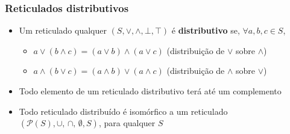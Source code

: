 \documentclass[12pt]{beamer}
\begin{document}
\begin{frame}
  \frametitle{Reticulados distributivos}
  \begin{itemize}
    \item<1-> Um reticulado qualquer $(S, \vee, \wedge, \bot, \top)$ é
        \textbf{distributivo} se, $\forall a, b, c \in S$,
    \begin{itemize}[itemsep=0pt]
      \item<2-> $a \vee (b \wedge c) = (a \vee b) \wedge (a \vee c)$
          (distribuição de $\vee$ sobre $\wedge$)
      \item<3-> $a \wedge (b \vee c) = (a \wedge b) \vee (a \wedge c)$
          (distribuição de $\wedge$ sobre $\vee$)
    \end{itemize}
    \item Todo elemento de um reticulado distributivo terá até um complemento
    \item Todo reticulado distribuído é isomórfico a um reticulado
        $(\mathcal{P}(S), \cup,\, \cap,\, \emptyset, S)$, para qualquer $S$
  \end{itemize}
\end{frame}
\end{document}
